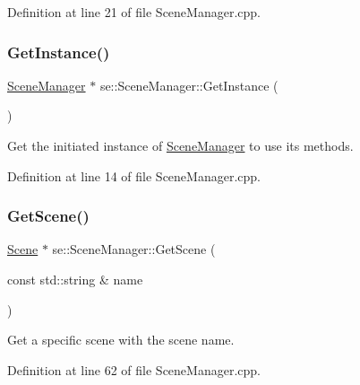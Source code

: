 Definition at line 21 of file Scene\+Manager.\+cpp.

\mbox{\label{classse_1_1_scene_manager_a3e70fb156c0abf1fd4f6aa9ceceb0203}} 
\subsubsection{\texorpdfstring{Get\+Instance()}{GetInstance()}}
{\footnotesize\ttfamily \mbox{\hyperlink{classse_1_1_scene_manager}{Scene\+Manager}} $\ast$ se\+::\+Scene\+Manager\+::\+Get\+Instance (\begin{DoxyParamCaption}{ }\end{DoxyParamCaption})\hspace{0.3cm}{\ttfamily [static]}}

Get the initiated instance of \mbox{\hyperlink{classse_1_1_scene_manager}{Scene\+Manager}} to use its methods. 

Definition at line 14 of file Scene\+Manager.\+cpp.

\mbox{\label{classse_1_1_scene_manager_ae43e9c01f5b3804a669b1a7ab89504d8}} 
\subsubsection{\texorpdfstring{Get\+Scene()}{GetScene()}}
{\footnotesize\ttfamily \mbox{\hyperlink{classse_1_1_scene}{Scene}} $\ast$ se\+::\+Scene\+Manager\+::\+Get\+Scene (\begin{DoxyParamCaption}\item[{const std\+::string \&}]{name }\end{DoxyParamCaption})}

Get a specific scene with the scene name. 

Definition at line 62 of file Scene\+Manager.\+cpp.

\mbox{\label{classse_1_1_scene_manager_aac6929d7dfd933c4d40fbf66b3740321}} 
